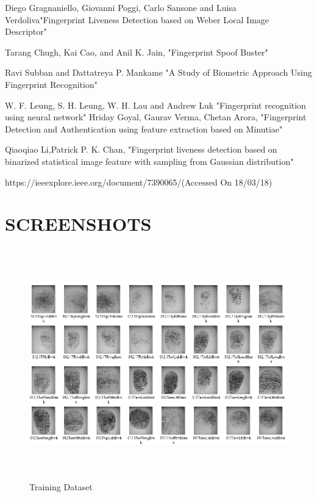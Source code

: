 \documentclass[a4paper,12pt,oneside]{article}
\begin{document}
\begin{thebibliography}{9}
Diego Gragnaniello, Giovanni Poggi, Carlo Sansone and Luisa Verdoliva{"Fingerprint Liveness Detection
based on Weber Local Image Descriptor"}


\bibitem Tarang Chugh, Kai Cao, and Anil K. Jain, {"Fingerprint Spoof Buster"}


\bibitem Ravi Subban and Dattatreya P. Mankame
{"A Study of Biometric Approach Using Fingerprint
Recognition"} 

\bibitem W. F. Leung, S. H. Leung, W. H. Lau and Andrew Luk  {"Fingerprint recognition using neural network"}
\bibitem
Hriday Goyal, Gaurav Verma, Chetan Arora, { "Fingerprint Detection and Authentication using feature extraction based on Minutiae" }

\bibitem  Qiaoqiao Li,Patrick P. K. Chan, {"Fingerprint liveness detection based on binarized statistical image feature with sampling from Gaussian distribution"}

https://ieeexplore.ieee.org/document/7390065/(Accessed On 18/03/18)



\end{thebibliography}
\newpage
\section{SCREENSHOTS}

\begin{figure}[H]
\centering
\includegraphics[height=10cm,width=15cm]{fingerinput.PNG}
\caption{Training Dataset}
\end{figure}
\end{document}
